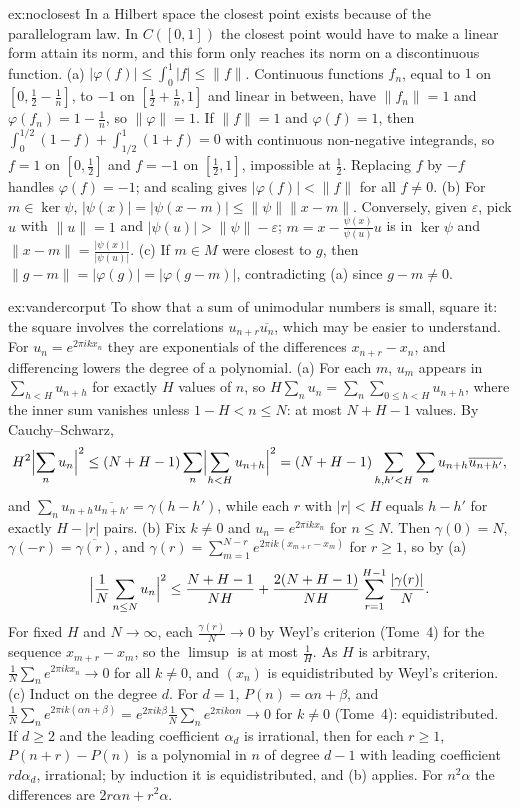 \begin{solution}{ex:noclosest}
\idea In a Hilbert space the closest point exists because of the parallelogram law. In $C([0,1])$ the closest point would have to make a linear form attain its norm, and this form only reaches its norm on a discontinuous
function.
\writeup (a) $|\varphi(f)|\le\int_0^1|f|\le\|f\|$. Continuous functions $f_n$, equal to $1$ on $[0,\frac12-\frac1n]$, to $-1$ on $[\frac12+\frac1n,1]$ and linear in between, have $\|f_n\|=1$ and $\varphi(f_n)=1-\frac1n$, so $\|\varphi\|=1$. If
$\|f\|=1$ and $\varphi(f)=1$, then $\int_0^{1/2}(1-f)+\int_{1/2}^1(1+f)=0$ with continuous non-negative integrands, so $f=1$ on $[0,\frac12]$ and $f=-1$ on $[\frac12,1]$, impossible at $\frac12$. Replacing $f$ by $-f$ handles
$\varphi(f)=-1$; and scaling gives $|\varphi(f)|<\|f\|$ for all $f\ne0$. (b) For $m\in\ker\psi$, $|\psi(x)|=|\psi(x-m)|\le\|\psi\|\|x-m\|$. Conversely, given $\varepsilon$, pick $u$ with $\|u\|=1$ and $|\psi(u)|>\|\psi\|-\varepsilon$;
$m=x-\frac{\psi(x)}{\psi(u)}u$ is in $\ker\psi$ and $\|x-m\|=\frac{|\psi(x)|}{|\psi(u)|}$. (c) If $m\in M$ were closest to $g$, then $\|g-m\|=|\varphi(g)|=|\varphi(g-m)|$, contradicting (a) since $g-m\ne0$.
\end{solution}

\begin{solution}{ex:vandercorput}
\idea To show that a sum of unimodular numbers is small, square it: the square involves the correlations $u_{n+r}\overline{u_n}$, which may be easier to understand. For $u_n=e^{2\pi ikx_n}$ they are exponentials of the
differences $x_{n+r}-x_n$, and differencing lowers the degree of a polynomial.
\writeup (a) For each $m$, $u_m$ appears in $\sum_{h<H}u_{n+h}$ for exactly $H$ values of $n$, so $H\sum_nu_n=\sum_n\sum_{0\le h<H}u_{n+h}$, where the inner sum vanishes unless $1-H<n\le N$: at most $N+H-1$ values. By
Cauchy--Schwarz,
\[H^2\Bigl|\sum_nu_n\Bigr|^2\le(N+H-1)\sum_n\Bigl|\sum_{h<H}u_{n+h}\Bigr|^2=(N+H-1)\sum_{h,h'<H}\sum_nu_{n+h}\overline{u_{n+h'}},\]
and $\sum_nu_{n+h}\overline{u_{n+h'}}=\gamma(h-h')$, while each $r$ with $|r|<H$ equals $h-h'$ for exactly $H-|r|$ pairs. (b) Fix $k\ne0$ and $u_n=e^{2\pi ikx_n}$ for $n\le N$. Then $\gamma(0)=N$, $\gamma(-r)=\overline{\gamma(r)}$, and
$\gamma(r)=\sum_{m=1}^{N-r}e^{2\pi ik(x_{m+r}-x_m)}$ for $r\ge1$, so by (a)
\[\Bigl|\frac1N\sum_{n\le N}u_n\Bigr|^2\le\frac{N+H-1}{NH}+\frac{2(N+H-1)}{NH}\sum_{r=1}^{H-1}\frac{|\gamma(r)|}N.\]
For fixed $H$ and $N\to\infty$, each $\frac{\gamma(r)}N\to0$ by Weyl's criterion (Tome~4) for the sequence $x_{m+r}-x_m$, so the $\limsup$ is at most $\frac1H$. As $H$ is arbitrary, $\frac1N\sum_ne^{2\pi ikx_n}\to0$ for all $k\ne0$, and
$(x_n)$ is equidistributed by Weyl's criterion. (c) Induct on the degree $d$. For $d=1$, $P(n)=\alpha n+\beta$, and $\frac1N\sum_ne^{2\pi ik(\alpha n+\beta)}=e^{2\pi ik\beta}\frac1N\sum_ne^{2\pi ik\alpha n}\to0$ for $k\ne0$ (Tome~4): equidistributed. If $d\ge2$ and the leading
coefficient $\alpha_d$ is irrational, then for each $r\ge1$, $P(n+r)-P(n)$ is a polynomial in $n$ of degree $d-1$ with leading coefficient $rd\alpha_d$, irrational; by induction it is equidistributed, and (b) applies. For
$n^2\alpha$ the differences are $2r\alpha n+r^2\alpha$.
\end{solution}

